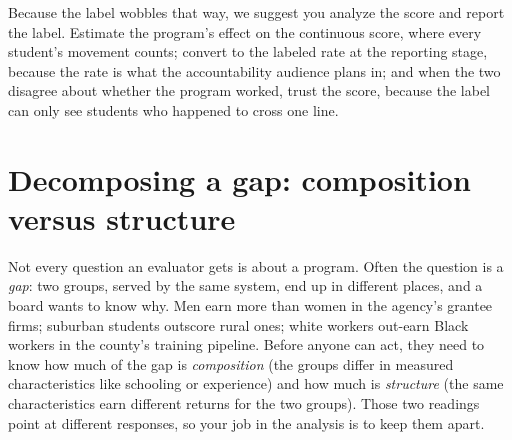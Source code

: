 Because the label wobbles that way, we suggest you analyze the score and report the label. Estimate the program's effect on the continuous score, where every student's movement counts; convert to the labeled rate at the reporting stage, because the rate is what the accountability audience plans in; and when the two disagree about whether the program worked, trust the score, because the label can only see students who happened to cross one line.

\section{Decomposing a gap: composition versus structure}\label{sec:oaxaca}
Not every question an evaluator gets is about a program. Often the question is a \emph{gap}: two groups, served by the same system, end up in different places, and a board wants to know why. Men earn more than women in the agency's grantee firms; suburban students outscore rural ones; white workers out-earn Black workers in the county's training pipeline. Before anyone can act, they need to know how much of the gap is \emph{composition} (the groups differ in measured characteristics like schooling or experience) and how much is \emph{structure} (the same characteristics earn different returns for the two groups). Those two readings point at different responses, so your job in the analysis is to keep them apart.

